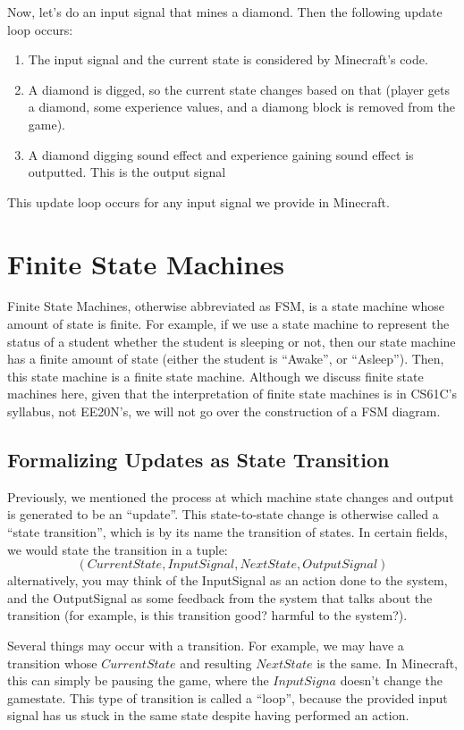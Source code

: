 Now, let's do an input signal that mines a diamond. Then the following update loop occurs:
\begin{enumerate}
    \item The input signal and the current state is considered by Minecraft's code.
    \item A diamond is digged, so the current state changes based on that (player gets a diamond, some experience values, and a diamong block is removed from the game).
    \item A diamond digging sound effect and experience gaining sound effect is outputted. This is the output signal
\end{enumerate}
This update loop occurs for any input signal we provide in Minecraft.

\section{Finite State Machines}
Finite State Machines, otherwise abbreviated as FSM, is a state machine whose amount of state is finite.
For example, if we use a state machine to represent the status of a student whether the student is sleeping or not, then our state machine has a finite amount of state (either the student is ``Awake'', or ``Asleep'').
Then, this state machine is a finite state machine.
Although we discuss finite state machines here, given that the interpretation of finite state machines is in CS61C's syllabus, not EE20N's, we will not go over the construction of a FSM diagram.

\subsection{Formalizing Updates as State Transition}
Previously, we mentioned the process at which machine state changes and output is generated to be an ``update''.
This state-to-state change is otherwise called a ``state transition'', which is by its name the transition of states.
In certain fields, we would state the transition in a tuple:
\[
    (CurrentState, InputSignal, NextState, OutputSignal)
\]
alternatively, you may think of the InputSignal as an action done to the system, and the OutputSignal as some feedback from the system that talks about the transition (for example, is this transition good? harmful to the system?).

Several things may occur with a transition.
For example, we may have a transition whose $CurrentState$ and resulting $NextState$ is the same.
In Minecraft, this can simply be pausing the game, where the $InputSigna$ doesn't change the gamestate.
This type of transition is called a ``loop'', because the provided input signal has us stuck in the same state despite having performed an action.
